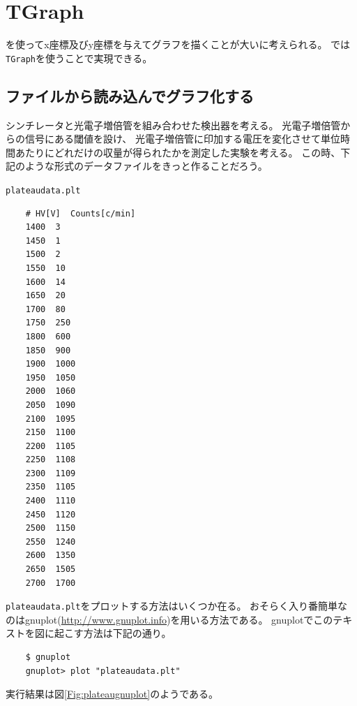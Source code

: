\clearpage
 \section{TGraph}
 \ROOT を使ってx座標及びy座標を与えてグラフを描くことが大いに考えられる。
 \ROOT では\verb|TGraph|を使うことで実現できる。


  \subsection{ファイルから読み込んでグラフ化する}
  シンチレータと光電子増倍管を組み合わせた検出器を考える。
  光電子増倍管からの信号にある閾値を設け、
  光電子増倍管に印加する電圧を変化させて単位時間あたりにどれだけの収量が得られたかを測定した実験を考える。
  この時、下記のような形式のデータファイルをきっと作ることだろう。
  \begin{itembox}{\texttt{plateaudata.plt}}
\begin{verbatim}
	# HV[V]  Counts[c/min]
	1400  3
	1450  1
	1500  2
	1550  10
	1600  14
	1650  20
	1700  80
	1750  250
	1800  600
	1850  900
	1900  1000
	1950  1050
	2000  1060
	2050  1090
	2100  1095
	2150  1100
	2200  1105
	2250  1108
	2300  1109
	2350  1105
	2400  1110
	2450  1120
	2500  1150
	2550  1240
	2600  1350
	2650  1505
	2700  1700
\end{verbatim}
  \end{itembox}
  \verb|plateaudata.plt|をプロットする方法はいくつか在る。
  おそらく入り番簡単なのはgnuplot(\url{http://www.gnuplot.info})を用いる方法である。
  gnuplotでこのテキストを図に起こす方法は下記の通り。
\begin{verbatim}
	$ gnuplot
	gnuplot> plot "plateaudata.plt"
\end{verbatim}

実行結果は図\ref{Fig:plateaugnuplot}のようである。

